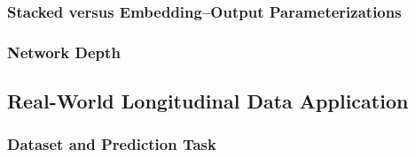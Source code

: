 \documentclass{article}
\begin{document}
%
%
%
%
%
%
%


\subsubsection{Stacked versus Embedding--Output Parameterizations}
\label{sec:embedding_ablation}

%
%
%
%


\subsubsection{Network Depth}
\label{sec:depth}

%
%



\subsection{Real-World Longitudinal Data Application}
\label{sec:real_data}


\subsubsection{Dataset and Prediction Task}
\label{sec:real_dataset}

%
\end{document}
